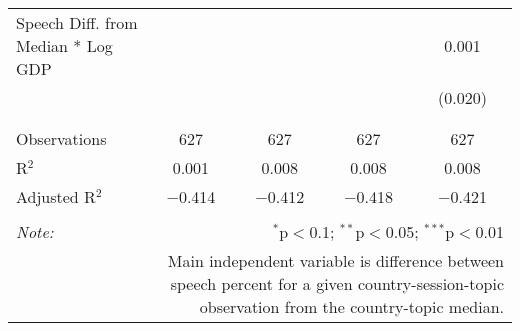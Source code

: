\begin{table}[!htbp]
\begin{tabular}{@{\extracolsep{5pt}}lcccc}
 Speech Diff. from Median * Log GDP &  &  &  & 0.001 \\ 
  &  &  &  & (0.020) \\ 
  & & & & \\ 
\hline \\[-1.8ex] 
Observations & 627 & 627 & 627 & 627 \\ 
R$^{2}$ & 0.001 & 0.008 & 0.008 & 0.008 \\ 
Adjusted R$^{2}$ & $-$0.414 & $-$0.412 & $-$0.418 & $-$0.421 \\ 
\hline 
\hline \\[-1.8ex] 
\textit{Note:}  & \multicolumn{4}{r}{$^{*}$p$<$0.1; $^{**}$p$<$0.05; $^{***}$p$<$0.01} \\ 
 & \multicolumn{4}{r}{Main independent variable is difference between speech percent for a given country-session-topic observation from the country-topic median.} \\ 
\end{tabular} 
\end{table} 
